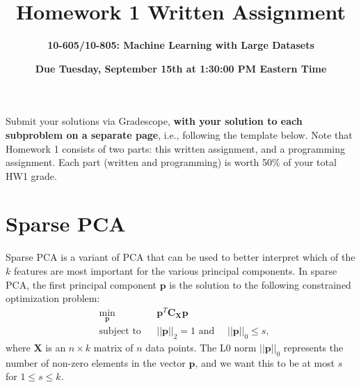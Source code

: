 \documentclass{exam}
\begin{document}
\title{Homework 1 Written Assignment}
\author{\Large \bf 10-605/10-805: Machine Learning with Large Datasets}
\date{{\bf Due Tuesday, September 15th at 1:30:00 PM Eastern Time}}
\maketitle

\noindent Submit your solutions via Gradescope, \textbf{with your solution to each subproblem on a separate page}, i.e., following the template below.  Note that Homework 1 consists of two parts: this written assignment, and a programming assignment. Each part (written and programming) is worth 50\% of your total HW1 grade.

\newpage

\section{Sparse PCA} Sparse PCA is a variant of PCA that can be used to better interpret which of the $k$ features are most important for the various principal components. In sparse PCA, the first principal component $\bm{p}$ is the solution to the following constrained optimization problem:
\vspace{-.5em}
\begin{equation}\label{eq:sparse_pca}
\begin{aligned}
& \min_{\bm{p}}
& & \bm{p}^T \mathbf{C_X} \bm{p} \\
& \text{subject to}
& & ||\bm{p}||_2 = 1 \text{ and } \quad ||\bm{p}||_0 \leq s,
\end{aligned}
\end{equation}
where $\mathbf{X}$ is an $n \times k$ matrix of $n$ data points. The L0 norm $||\bm{p}||_0$ represents the number of non-zero elements in the vector $\bm{p}$, and we want this to be at most $s$ for $1 \leq s \leq k$.
\end{document}

